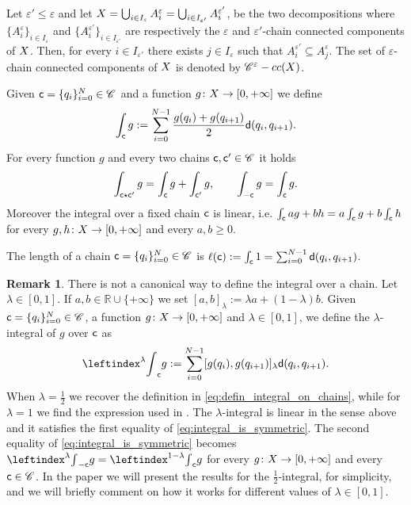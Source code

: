 \documentclass[12pt]{amsart}
\newcommand{\R}{\mathbb{R}}
\newcommand{\sfd}{{\sf d}}
\newcommand{\X}{{\rm X}}
\theoremstyle{definition}
\newtheorem{remark}[theorem]{Remark}
\newcommand{\sfc}{{\sf c}}
\newcommand{\Chain}[1]{\mathscr{C}^{#1}}
\begin{document}
Let $\varepsilon' \le \varepsilon$ and let $\X =\bigcup_{i\in I_\varepsilon} A_i^\varepsilon =\bigcup_{i\in I_{\varepsilon'}} A_i^{\varepsilon'}$, be the two decompositions where $\{A_i^\varepsilon\}_{i\in I_\varepsilon}$ and $\{A_i^{\varepsilon'}\}_{i \in I_{\varepsilon'}}$ are respectively the $\varepsilon$ and $\varepsilon'$-chain connected components of $\X$. Then, for every $i \in I_{\varepsilon'}$ there exists $j\in I_{\varepsilon}$ such that $A_i^{\varepsilon'} \subseteq A_j^{\varepsilon}$. The set of $\varepsilon$-chain connected components of $\X$ is denoted by $\Chain{\varepsilon}\textup{-cc}(\X)$.

Given $\sfc=\{ q_i \}_{i=0}^N \in \Chain{}$ and a function $g \colon \X \to [0,+\infty]$ we define
\begin{equation}
\label{eq:defin_integral_on_chains}
    \int_{{\sfc}} g := \sum_{i=0}^{N-1}\frac{g(q_i) + g(q_{i+1})}{2}\sfd(q_i,q_{i+1}).
\end{equation}
For every function $g$ and every two chains $\sfc,\sfc' \in \Chain{}$ it holds
\begin{equation}
\label{eq:integral_is_symmetric}
    \int_{\sfc \star \sfc'} g = \int_\sfc g + \int_{\sfc'} g,\qquad \int_{-\sfc} g = \int_\sfc g.
\end{equation}
Moreover the integral over a fixed chain $\sfc$ is linear, i.e. $\int_\sfc a g + b h = a \int_\sfc g + b \int_\sfc h$ for every $g,h \colon \X \to [0,+\infty]$ and every $a,b \ge 0$. 

The length of a chain $\sfc = \{q_i\}_{i=0}^N \in \Chain{}$ is $\ell(\sfc):=\int_{\sfc} 1 =\sum_{i=0}^{N-1}\sfd(q_i,q_{i+1})$. 
\begin{remark}
\label{rmk:lambda_integral_over_chains}
    There is not a canonical way to define the integral over a chain. Let $\lambda \in [0,1]$. If $a,b \in \R \cup \{+\infty\}$ we set $[a,b]_\lambda := \lambda a + (1-\lambda) b$. Given $\sfc=\{ q_i \}_{i=0}^N \in \Chain{}$, a function $g \colon \X \to [0,+\infty]$ and $\lambda \in [0,1]$, we define the $\lambda$-integral of $g$ over $\sfc$ as
    \begin{equation}
    \label{eq:defin_integral_on_chains_lambda}
        \leftindex^\lambda{\int}_{{\sfc}} g := \sum_{i=0}^{N-1}[g(q_i),g(q_{i+1})]_\lambda\sfd(q_i,q_{i+1}).
    \end{equation}
    When $\lambda = \frac12$ we recover the definition in \eqref{eq:defin_integral_on_chains}, while for $\lambda = 1$ we find the expression used in \cite{Eriksson-Bique-Density-in-energy}. 
    The $\lambda$-integral is linear in the sense above and it satisfies the first equality of \eqref{eq:integral_is_symmetric}. The second equality of \eqref{eq:integral_is_symmetric} becomes
    $\leftindex^\lambda{\int}_{-\sfc} g = \leftindex^{1-\lambda}{\int}_\sfc g$ for every $g\colon \X \to [0,+\infty]$ and every $\sfc \in \Chain{}$. In the paper we will present the results for the $\frac12$-integral, for simplicity, and we will briefly comment on how it works for different values of $\lambda \in [0,1]$.
\end{remark}
\end{document}
